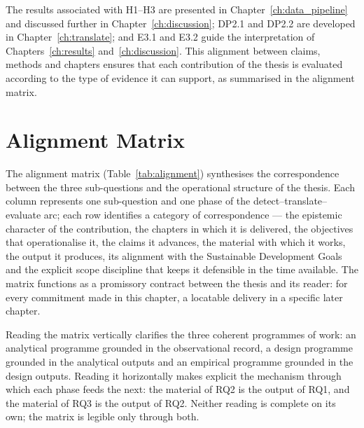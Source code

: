 The results associated with H1--H3 are presented in Chapter~\ref{ch:data_pipeline} and discussed further in Chapter~\ref{ch:discussion}; DP2.1 and DP2.2 are developed in Chapter~\ref{ch:translate}; and E3.1 and E3.2 guide the interpretation of Chapters~\ref{ch:results} and~\ref{ch:discussion}. This alignment between claims, methods and chapters ensures that each contribution of the thesis is evaluated according to the type of evidence it can support, as summarised in the alignment matrix.

\section{Alignment Matrix}
\label{sec:alignment-matrix}

The alignment matrix (Table~\ref{tab:alignment}) synthesises the correspondence between the three sub-questions and the operational structure of the thesis. Each column represents one sub-question and one phase of the detect--translate--evaluate arc; each row identifies a category of correspondence --- the epistemic character of the contribution, the chapters in which it is delivered, the objectives that operationalise it, the claims it advances, the material with which it works, the output it produces, its alignment with the Sustainable Development Goals and the explicit scope discipline that keeps it defensible in the time available. The matrix functions as a promissory contract between the thesis and its reader: for every commitment made in this chapter, a locatable delivery in a specific later chapter.

Reading the matrix vertically clarifies the three coherent programmes of work: an analytical programme grounded in the observational record, a design programme grounded in the analytical outputs and an empirical programme grounded in the design outputs. Reading it horizontally makes explicit the mechanism through which each phase feeds the next: the material of RQ2 is the output of RQ1, and the material of RQ3 is the output of RQ2. Neither reading is complete on its own; the matrix is legible only through both.

